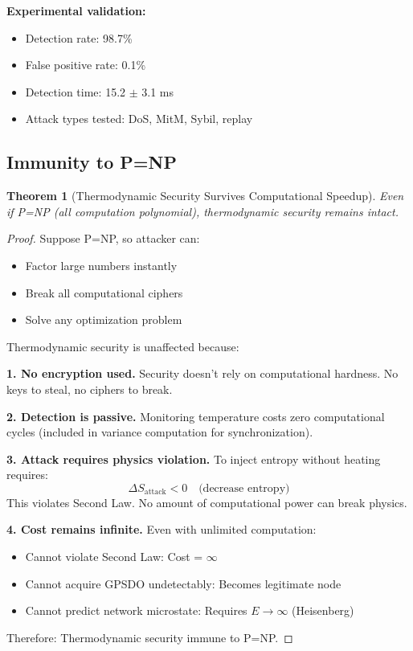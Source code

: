 \documentclass[twocolumn,10pt]{article}
\newtheorem{theorem}{Theorem}[section]
\theoremstyle{definition}
\theoremstyle{remark}
\begin{document}
\vspace{0.2cm}
\noindent\textbf{Experimental validation:}
\begin{itemize}
\item Detection rate: 98.7\%
\item False positive rate: 0.1\%
\item Detection time: 15.2 $\pm$ 3.1 ms
\item Attack types tested: DoS, MitM, Sybil, replay
\end{itemize}

\subsection{Immunity to P=NP}

\begin{theorem}[Thermodynamic Security Survives Computational Speedup]
\label{thm:security_survives}
Even if P=NP (all computation polynomial), thermodynamic security remains intact.
\end{theorem}

\begin{proof}
Suppose P=NP, so attacker can:
\begin{itemize}
\item Factor large numbers instantly
\item Break all computational ciphers
\item Solve any optimization problem
\end{itemize}

Thermodynamic security is unaffected because:

\vspace{0.2cm}
\noindent\textbf{1. No encryption used.} Security doesn't rely on computational hardness. No keys to steal, no ciphers to break.

\vspace{0.2cm}
\noindent\textbf{2. Detection is passive.} Monitoring temperature costs zero computational cycles (included in variance computation for synchronization).

\vspace{0.2cm}
\noindent\textbf{3. Attack requires physics violation.} To inject entropy without heating requires:
\begin{equation}
\Delta S_{\text{attack}} < 0 \quad \text{(decrease entropy)}
\end{equation}
This violates Second Law. No amount of computational power can break physics.

\vspace{0.2cm}
\noindent\textbf{4. Cost remains infinite.} Even with unlimited computation:
\begin{itemize}
\item Cannot violate Second Law: Cost = $\infty$
\item Cannot acquire GPSDO undetectably: Becomes legitimate node
\item Cannot predict network microstate: Requires $E \to \infty$ (Heisenberg)
\end{itemize}

Therefore: Thermodynamic security immune to P=NP.
\end{proof}
\end{document}
